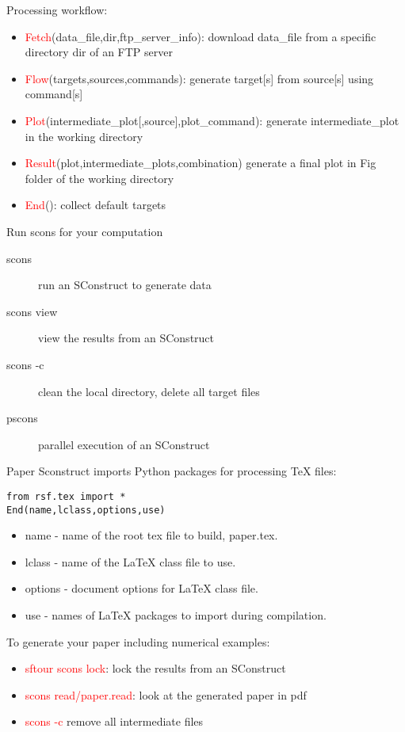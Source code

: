   Processing workflow:
  \begin{itemize}
    \item \textcolor{red}{Fetch}(data\_file,dir,ftp\_server\_info): download data\_file from a specific directory dir of an FTP server
    \item \textcolor{red}{Flow}(targets,sources,commands): generate target[s]  from source[s] using command[s]
    \item \textcolor{red}{Plot}(intermediate\_plot[,source],plot\_command): generate intermediate\_plot in the working directory
    \item \textcolor{red}{Result}(plot,intermediate\_plots,combination) generate a final plot  in Fig folder of the working directory
    \item \textcolor{red}{End}(): collect default targets 
  \end{itemize}
  \vspace{1em}
  Run scons for your computation
  \begin{description}
    \item[scons] run an SConstruct to generate data
    \item[scons view] view the results from an SConstruct
    \item[scons -c] clean the local directory, delete all target files
    \item[pscons] parallel execution of an SConstruct 
  \end{description}


Paper Sconstruct imports Python packages for processing TeX files:
\lstset{language=python,numbers=left,numberstyle=\tiny,showstringspaces=false,frame=single}
\begin{lstlisting}
from rsf.tex import * 
End(name,lclass,options,use)
\end{lstlisting}
  \begin{itemize}
    \item name - name of the root tex file to build, paper.tex.
    \item lclass - name of the LaTeX class file to use.
    \item options - document options for LaTeX class file.
    \item use - names of LaTeX packages to import during compilation.
  \end{itemize}
To generate your paper including numerical examples:
 \begin{itemize}
  \item \textcolor{red}{sftour scons lock}: lock the results from an SConstruct
  \item \textcolor{red}{scons read/paper.read}:	look at the generated paper in pdf
  \item \textcolor{red}{scons -c} remove all intermediate files
 \end{itemize}
 
